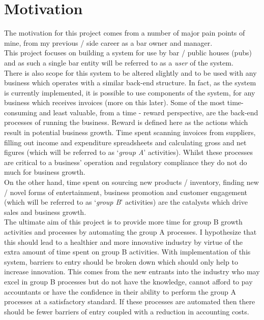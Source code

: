 \section{Motivation}
The motivation for this project comes from a number of major pain points of mine, from my previous / side career as a bar owner and manager. \\ This project focuses on building a system for use by
bar / public houses (pubs) and as such a single bar entity will be referred to as a \emph{user} of the system.\\
There is also scope for this system to be altered slightly and to be used with any business which operates with a similar back-end structure.
In fact, as the system is currently implemented, it is possible to use components of the system, for any business
which receives invoices (more on this later).
\bigbreak
Some of the most time-consuming and least valuable, from a time - reward perspective, are the back-end processes of running the business. Reward is defined here as the actions which result
in potential business growth. Time spent scanning invoices from suppliers, filling out income and expenditure spreadsheets and calculating gross and net figures (which will be referred to
as `\emph{group A}' activities). Whilst these processes are critical to a business' operation and regulatory compliance they do not do much for business growth.\\
On the other hand, time spent on sourcing new products / inventory, finding new / novel forms of entertainment, business promotion and customer engagement (which will be referred to as
`\emph{group B}' activities) are the catalysts which drive sales and business growth.\\
The ultimate aim of this project is to provide more time for group B growth activities and processes by automating the group A processes.
\bigbreak
I hypothesize that this should lead to a healthier and more innovative industry by virtue of the extra amount of time spent on group B activities. With implementation of this system,
barriers to entry should be broken down which should only help to increase innovation. This comes from the new entrants into the industry who may excel in group B processes but do not have
the knowledge, cannot afford to pay accountants or have the confidence in their ability to perform the group A processes at a satisfactory standard. If these processes are automated then
there should be fewer barriers of entry coupled with a reduction in accounting costs. \\
